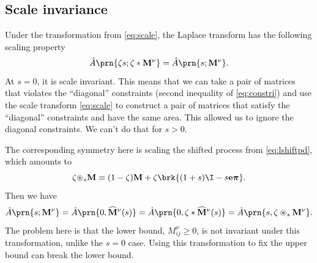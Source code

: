 \documentclass[12pt]{article}
\newcommand{\onev}{\mathbf{e}}
\newcommand{\eqm}{\pi}
\newcommand{\eq}{\boldsymbol{\eqm}}
\newcommand{\MMdm}{M}
\newcommand{\MMd}{\mathbf{\MMdm}}
\newcommand{\shift}[1]{\widehat{#1}}
\begin{document}

\subsection{Scale invariance}\label{sec:scale}

Under the transformation from \cref{eq:scale}, the Laplace transform has the following scaling property
%
\begin{equation}\label{eq:laplacescale}
  \hat{A} \prn{\zeta s;\zeta * \MMd^\nu} = \hat{A} \prn{s; \MMd^\nu}.
\end{equation}
%
At \(s = 0\), it is scale invariant.
This means that we can take a pair of matrices that violates the ``diagonal'' constraints (second inequality of \eqref{eq:constri}) and use the scale transform \eqref{eq:scale} to construct a pair of matrices that satisfy the ``diagonal'' constraints and have the same area.
This allowed us to ignore the diagonal constraints.
We can't do that for \(s > 0\).

The corresponding symmetry here is scaling the shifted process from \cref{eq:lshiftpd}, which amounts to
%
\begin{equation}\label{eq:shiftscale}
  \zeta {\circledast}_{s} \MMd 
      \equiv (1 - \zeta) \MMd
      + \zeta \brk{(1 + s)\I - s \onev \eq} .
\end{equation}
%
Then we have
%
\begin{equation}\label{eq:lshiftscale}
  \hat{A} \prn{s; \MMd^\nu} 
    = \hat{A} \prn{0, \shift{\MMd}^\nu(s)}
    = \hat{A} \prn{0, \zeta * \shift{\MMd}^\nu(s)}
    = \hat{A} \prn{s, \zeta \circledast_s \MMd^\nu}.
\end{equation}
%
The problem here is that the lower bound, \(\MMdm^\nu_{ij} \geq 0\), 
is not invariant under this transformation, unlike the \(s = 0\) case.
Using this transformation to fix the upper bound can break the lower bound.
\end{document}
